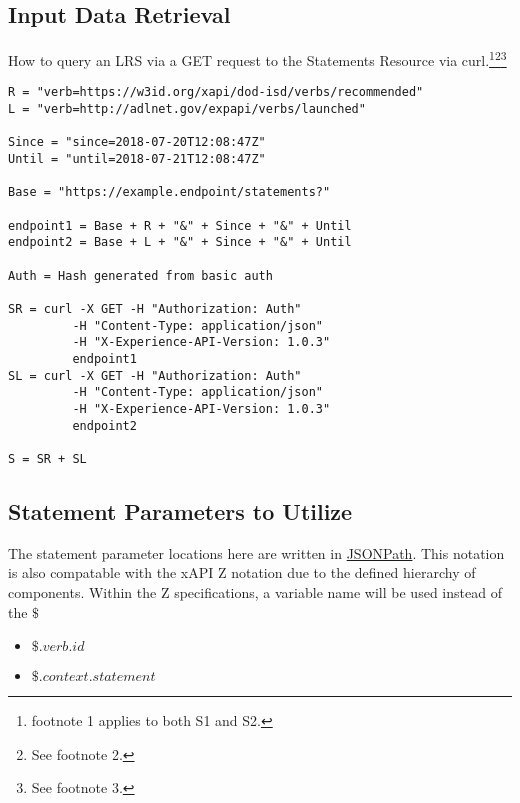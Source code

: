\documentclass{article}
\begin{document}
\subsection{Input Data Retrieval}

How to query an LRS via a GET request to the Statements Resource via
curl.\footnote{\label{refMoreLink2} footnote 1 applies to both S1
  and S2.}\footnote{\label{refnoZ2} See footnote
  2.}\footnote{\label{refallTime2} See footnote 3.}

\begin{lstlisting}[frame=single]
R = "verb=https://w3id.org/xapi/dod-isd/verbs/recommended"
L = "verb=http://adlnet.gov/expapi/verbs/launched"

Since = "since=2018-07-20T12:08:47Z"
Until = "until=2018-07-21T12:08:47Z"

Base = "https://example.endpoint/statements?"

endpoint1 = Base + R + "&" + Since + "&" + Until
endpoint2 = Base + L + "&" + Since + "&" + Until

Auth = Hash generated from basic auth

SR = curl -X GET -H "Authorization: Auth"
         -H "Content-Type: application/json"
         -H "X-Experience-API-Version: 1.0.3"
         endpoint1
SL = curl -X GET -H "Authorization: Auth"
         -H "Content-Type: application/json"
         -H "X-Experience-API-Version: 1.0.3"
         endpoint2

S = SR + SL
\end{lstlisting}

\subsection{Statement Parameters to Utilize}

The statement parameter locations here are written in
\href{http://goessner.net/articles/JsonPath/}{JSONPath}. This notation
is also compatable with the xAPI Z notation due to the defined
hierarchy of components. Within the Z specifications, a variable name
will be used instead of the $\$$
\begin{itemize}
\item $\$.verb.id$
\item $\$.context.statement$
\end{itemize}
\end{document}
